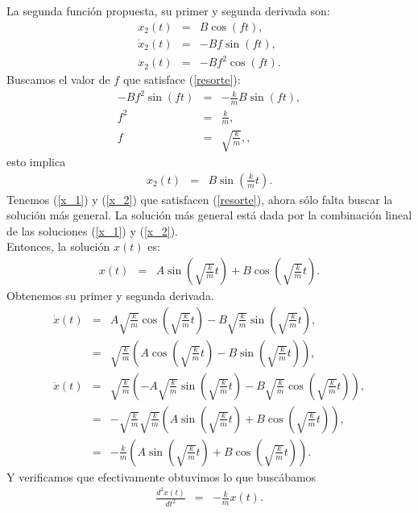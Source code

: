 \documentclass[letterpaper,12pt,oneside]{book}
\begin{document}
%
La segunda funci\'on propuesta, su primer y segunda derivada son:
% 
\begin{eqnarray}
x_2(t)&=&B\cos(ft),\label{x_2} \\
\dot x_2(t)&=&-Bf\sin(ft),\nonumber \\
\ddot x_2(t)&=&-Bf^2\cos(ft).\nonumber
\end{eqnarray}
%
Buscamos el valor de $f$ que satisface (\ref{resorte}):
%
\begin{eqnarray}
-Bf^2\sin(ft) &=&  -\frac{k}{m}B\sin(ft),\nonumber \\
f^2 &=& \frac{k}{m},\nonumber \\
f&=&\sqrt{\frac{k}{m}},\nonumber,
\end{eqnarray}
%
esto implica
%
\begin{eqnarray}
x_2(t)&=&B\sin\left(\frac{k}{m}t\right). \nonumber
\end{eqnarray}
%
Tenemos (\ref{x_1}) y (\ref{x_2}) que satisfacen (\ref{resorte}), ahora s\'olo falta buscar la soluci\'on m\'as general. La soluci\'on m\'as general est\'a dada por la combinaci\'on lineal de las soluciones (\ref{x_1}) y (\ref{x_2}). \\
Entonces, la soluci\'on $x(t)$ es:
%
\begin{eqnarray}
x(t)&=&A\sin\left(\sqrt{\frac{k}{m}}t\right)+ B\cos\left(\sqrt{\frac{k}{m}}t\right).\label{comlineal}
%
\end{eqnarray}
Obtenemos su primer y segunda derivada.
\begin{eqnarray}
\dot x(t)&=&A\sqrt{\frac{k}{m}}\cos\left(\sqrt{\frac{k}{m}}t\right)- B\sqrt{\frac{k}{m}}\sin\left(\sqrt{\frac{k}{m}}t\right),\nonumber\\
&=&\sqrt{\frac{k}{m}}\left(A\cos\left(\sqrt{\frac{k}{m}}t\right)- B\sin\left(\sqrt{\frac{k}{m}}t\right)\right)\label{xpunto}, \nonumber \\
\ddot x(t) &=& \sqrt{\frac{k}{m}}\left(-A\sqrt{\frac{k}{m}}\sin\left(\sqrt{\frac{k}{m}}t\right)- B\sqrt{\frac{k}{m}}\cos\left(\sqrt{\frac{k}{m}}t\right)\right),\nonumber \\
&=&-\sqrt{\frac{k}{m}}\sqrt{\frac{k}{m}}\left(A\sin\left(\sqrt{\frac{k}{m}}t\right) + B\cos\left(\sqrt{\frac{k}{m}}t\right)\right), \nonumber \\
&=&-\frac{k}{m}\left(A\sin\left(\sqrt{\frac{k}{m}}t\right) + B\cos\left(\sqrt{\frac{k}{m}}t\right)\right). \nonumber
\end{eqnarray}
%
Y verificamos que efectivamente obtuvimos lo que busc\'abamos
\begin{eqnarray}
\frac{d^{2}x(t)}{dt^{2}}&=&-\frac{k}{m}x(t). \nonumber
\end{eqnarray}
\end{document}

